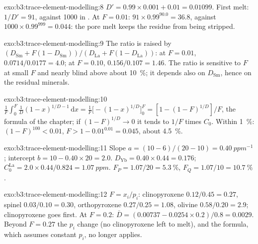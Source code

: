 \begin{solution}{exo:b3:trace-element-modelling:8}
$D' = 0.99\times0.001 + 0.01 = 0.01099$. First melt: $1/D' = 91$, against
1000 in . At $F = 0.01$: $91\times0.99^{90.0} = 36.8$,
against $1000\times0.99^{999} = 0.044$: the pore melt keeps the residue from
being stripped.
\end{solution}

\begin{solution}{exo:b3:trace-element-modelling:9}
The ratio is raised by $(D_{\mathrm{Sm}} + F(1 - D_{\mathrm{Sm}}))/(D_{\mathrm{La}}
+ F(1 - D_{\mathrm{La}}))$: at $F = 0.01$, $0.0714/0.0177 = 4.0$; at $F = 0.10$,
$0.156/0.107 = 1.46$. The ratio is sensitive to $F$ at small $F$ and nearly
blind above about \qty{10}{\percent}; it depends also on $D_{\mathrm{Sm}}$,
hence on the residual minerals.
\end{solution}

\begin{solution}{exo:b3:trace-element-modelling:10}
$\frac1F\int_0^F \frac1D(1 - x)^{1/D - 1}\,\mathrm dx = \frac1F\bigl[-(1 -
x)^{1/D}\bigr]_0^F = [1 - (1 - F)^{1/D}]/F$, the formula of the chapter; if
$(1 - F)^{1/D} \to 0$ it tends to $1/F$ times $C_0$. Within \qty{1}{\percent}:
$(1 - F)^{100} < 0.01$, $F > 1 - 0.01^{0.01} = 0.045$, about
\qty{4.5}{\percent}.
\end{solution}

\begin{solution}{exo:b3:trace-element-modelling:11}
Slope $a = (10 - 6)/(20 - 10) = \qty{0.40}{ppm^{-1}}$; intercept $b = 10 -
0.40\times20 = 2.0$. $D_{\mathrm{Yb}} = 0.40\times0.44 = 0.176$;
$C_0^{\mathrm{La}} = 2.0\times0.44/0.824 = \qty{1.07}{ppm}$. $F_P = 1.07/20 =
\qty{5.3}{\percent}$, $F_Q = 1.07/10 = \qty{10.7}{\percent}$.
\end{solution}

\begin{solution}{exo:b3:trace-element-modelling:12}
$F = x_i/p_i$: clinopyroxene $0.12/0.45 = 0.27$, spinel $0.03/0.10 = 0.30$,
orthopyroxene $0.27/0.25 = 1.08$, olivine $0.58/0.20 = 2.9$; clinopyroxene
goes first. At $F = 0.2$: $\bar D = (0.00737 - 0.0254\times0.2)/0.8 =
0.0029$. Beyond $F = 0.27$ the $p_i$ change (no clinopyroxene left to melt),
and the formula, which assumes constant $p_i$, no longer applies.
\end{solution}

